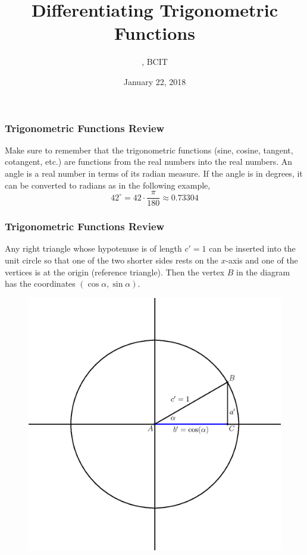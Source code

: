 \documentclass[xcolor=dvipsnames]{beamer}
\title{Differentiating Trigonometric Functions}
\subtitle{{\CourseNumber}, BCIT}
\author{\CourseName}
\date{January 22, 2018}
\begin{document}
\begin{frame}
  \titlepage
\end{frame}

\begin{frame}
  \frametitle{Trigonometric Functions Review}
Make sure to remember that the trigonometric functions (sine, cosine,
tangent, cotangent, etc.) are functions from the real numbers into the
real numbers. An angle is a real number in terms of its
\alert{radian} measure. If the angle is in degrees, it can be
converted to radians as in the following example,
\begin{equation}
  \label{eq:eedeehuc}
  42^{\circ}=42\cdot\frac{\pi}{180}\approx{}0.73304
\end{equation}
\end{frame}

\begin{frame}
  \frametitle{Trigonometric Functions Review}
  Any right triangle whose hypotenuse is of length $c'=1$ can be
  inserted into the unit circle so that one of the two shorter sides
  rests on the $x$-axis and one of the vertices is at the origin
  (reference triangle). Then the vertex $B$ in the diagram has the
  coordinates $(\cos\alpha,\sin\alpha)$.
    \begin{figure}[h]
    \includegraphics[scale=.45]{./diagrams/cosine.eps}
  \end{figure}
\end{frame}
\end{document}

